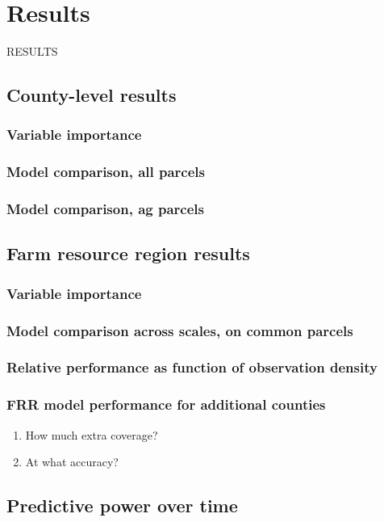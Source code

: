 \documentclass[12pt]{article}
\begin{document}
\newpage

\section{Results}

RESULTS
\subsection{County-level results}
 \subsubsection{Variable importance}
 \subsubsection{Model comparison, all parcels}
 \subsubsection{Model comparison, ag parcels}
 
\subsection{Farm resource region results}
 \subsubsection{Variable importance}
 \subsubsection{Model comparison across scales, on common parcels}
 \subsubsection{Relative performance as function of observation density}
 \subsubsection{FRR model performance for additional counties}
 
 \begin{enumerate}
    \item How much extra coverage?
    \item At what accuracy?
 \end{enumerate}
 
  
\subsection{Predictive power over time}
\end{document}
